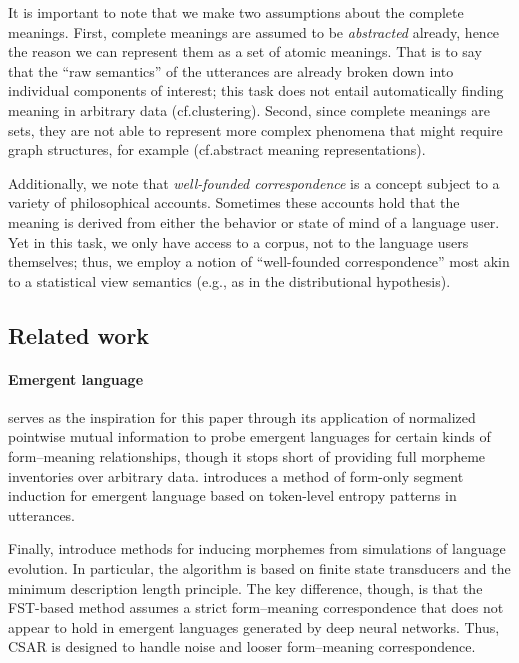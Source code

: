 It is important to note that we make two assumptions about the complete meanings.
First, complete meanings are assumed to be \emph{abstracted} already, hence the reason we can represent them as a set of atomic meanings.
That is to say that the ``raw semantics'' of the utterances are already broken down into individual components of interest; this task does not entail automatically finding meaning in arbitrary data (cf.\@ clustering).
Second, since complete meanings are sets, they are not able to represent more complex phenomena that might require graph structures, for example (cf.\@ abstract meaning representations).

Additionally, we note that \emph{well-founded correspondence} is a concept subject to a variety of philosophical accounts.
Sometimes these accounts hold that the meaning is derived from either the behavior or state of mind of a language user.
Yet in this task, we only have access to a corpus, not to the language users themselves;
  thus, we employ a notion of ``well-founded correspondence'' most akin to a statistical view semantics (e.g., as in the distributional hypothesis).


\subsection{Related work}

\paragraph{Emergent language}

\citet{lipinski2024speaking} serves as the inspiration for this paper through its application of normalized pointwise mutual information to probe emergent languages for certain kinds of form--meaning relationships,
  though it stops short of providing full morpheme inventories over arbitrary data.
\citet{ueda2023on} introduces a method of form-only segment induction for emergent language based on token-level entropy patterns in utterances.

Finally, \citet{brighton} introduce methods for inducing morphemes from simulations of language evolution.
In particular, the algorithm is based on finite state transducers and the minimum description length principle.
The key difference, though, is that the FST-based method assumes a strict form--meaning correspondence that does not appear to hold in emergent languages generated by deep neural networks.
Thus, CSAR is designed to handle noise and looser form--meaning correspondence.

